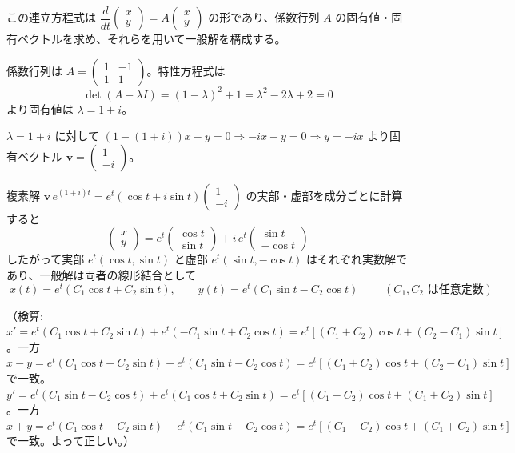
この連立方程式は $\dfrac{d}{dt}\begin{pmatrix} x \\ y \end{pmatrix} = A \begin{pmatrix} x \\ y \end{pmatrix}$ の形であり、係数行列 $A$ の固有値・固有ベクトルを求め、それらを用いて一般解を構成する。

係数行列は $A = \begin{pmatrix} 1 & -1 \\ 1 & 1 \end{pmatrix}$。特性方程式は
\[
\det(A - \lambda I) = (1-\lambda)^{2} + 1 = \lambda^{2} - 2\lambda + 2 = 0
\]
より固有値は $\lambda = 1 \pm i$。

\noindent
$\lambda = 1 + i$ に対して $(1 - (1+i))x - y = 0 \Rightarrow -ix - y = 0 \Rightarrow y = -ix$ より固有ベクトル $\bm{v} = \begin{pmatrix} 1 \\ -i \end{pmatrix}$。

\noindent
複素解 $\bm{v}\,e^{(1+i)t} = e^{t}(\cos t + i \sin t)\begin{pmatrix} 1 \\ -i \end{pmatrix}$ の実部・虚部を成分ごとに計算すると
\[
\begin{pmatrix} x \\ y \end{pmatrix}
= e^{t}\begin{pmatrix} \cos t \\ \sin t \end{pmatrix} + i\, e^{t}\begin{pmatrix} \sin t \\ -\cos t \end{pmatrix}
\]
したがって実部 $e^{t}(\cos t, \sin t)$ と虚部 $e^{t}(\sin t, -\cos t)$ はそれぞれ実数解であり、一般解は両者の線形結合として
\[
\boxed{\;
x(t) = e^{t}(C_{1}\cos t + C_{2}\sin t), \qquad
y(t) = e^{t}(C_{1}\sin t - C_{2}\cos t)
\;}
\qquad (C_{1}, C_{2} \text{ は任意定数})
\]

（検算: $x' = e^{t}(C_{1}\cos t+C_{2}\sin t) + e^{t}(-C_{1}\sin t+C_{2}\cos t) = e^{t}[(C_{1}+C_{2})\cos t+(C_{2}-C_{1})\sin t]$。一方 $x-y = e^{t}(C_{1}\cos t+C_{2}\sin t) - e^{t}(C_{1}\sin t-C_{2}\cos t) = e^{t}[(C_{1}+C_{2})\cos t+(C_{2}-C_{1})\sin t]$ で一致。$y' = e^{t}(C_{1}\sin t-C_{2}\cos t)+e^{t}(C_{1}\cos t+C_{2}\sin t) = e^{t}[(C_{1}-C_{2})\cos t+(C_{1}+C_{2})\sin t]$。一方 $x+y = e^{t}(C_{1}\cos t+C_{2}\sin t)+e^{t}(C_{1}\sin t-C_{2}\cos t) = e^{t}[(C_{1}-C_{2})\cos t+(C_{1}+C_{2})\sin t]$ で一致。よって正しい。）
